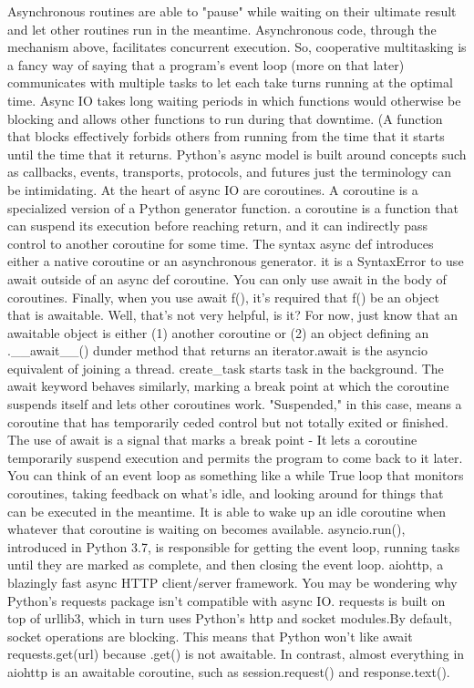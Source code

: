 Asynchronous routines are able to "pause" while waiting on their ultimate result and let other routines run in the meantime. Asynchronous code, through the mechanism above, facilitates concurrent execution. So, cooperative multitasking is a fancy way of saying that a program's event loop (more on that later) communicates with multiple tasks to let each take turns running at the optimal time. Async IO takes long waiting periods in which functions would otherwise be blocking and allows other functions to run during that downtime. (A function that blocks effectively forbids others from running from the time that it starts until the time that it returns. Python's async model is built around concepts such as callbacks, events, transports, protocols, and futures just the terminology can be intimidating.
At the heart of async IO are coroutines. A coroutine is a specialized version of a Python generator function. a coroutine is a function that can suspend its execution before reaching return, and it can indirectly pass control to another coroutine for some time. The syntax async def introduces either a native coroutine or an asynchronous generator. it is a SyntaxError to use await outside of an async def coroutine. You can only use await in the body of coroutines. Finally, when you use await f(), it's required that f() be an object that is awaitable. Well, that’s not very helpful, is it? For now, just know that an awaitable object is either (1) another coroutine or (2) an object defining an .__await__() dunder method that returns an iterator.await is the asyncio equivalent of joining a thread.  create_task starts task in the background. The await keyword behaves similarly, marking a break point at which the coroutine suspends itself and lets other coroutines work. "Suspended," in this case, means a coroutine that has temporarily ceded control but not totally exited or finished. The use of await is a signal that marks a break point - It lets a coroutine temporarily suspend execution and permits the program to come back to it later.
You can think of an event loop as something like a while True loop that monitors coroutines, taking feedback on what's idle, and looking around for things that can be executed in the meantime. It is able to wake up an idle coroutine when whatever that coroutine is waiting on becomes available. asyncio.run(), introduced in Python 3.7, is responsible for getting the event loop, running tasks until they are marked as complete, and then closing the event loop.
 aiohttp, a blazingly fast async HTTP client/server framework. You may be wondering why Python's requests package isn't compatible with async IO. requests is built on top of urllib3, which in turn uses Python's http and socket modules.By default, socket operations are blocking. This means that Python won't like await requests.get(url) because .get() is not awaitable. In contrast, almost everything in aiohttp is an awaitable coroutine, such as session.request() and response.text(). 
 
